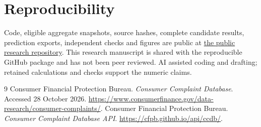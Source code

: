 \documentclass[11pt]{article}
\begin{document}
\section*{Reproducibility}
Code, eligible aggregate snapshots, source hashes, complete candidate results, prediction exports, independent checks and figures are public at \href{https://github.com/S3R3Bii/complaint-capacity-forecasting}{the public research repository}. This research manuscript is shared with the reproducible GitHub package and has not been peer reviewed. AI assisted coding and drafting; retained calculations and checks support the numeric claims.

\begin{thebibliography}{9}
 Consumer Financial Protection Bureau. \emph{Consumer Complaint Database}. Accessed 28 October 2026. \url{https://www.consumerfinance.gov/data-research/consumer-complaints/}.
 Consumer Financial Protection Bureau. \emph{Consumer Complaint Database API}. \url{https://cfpb.github.io/api/ccdb/}.
\end{thebibliography}
\end{document}
